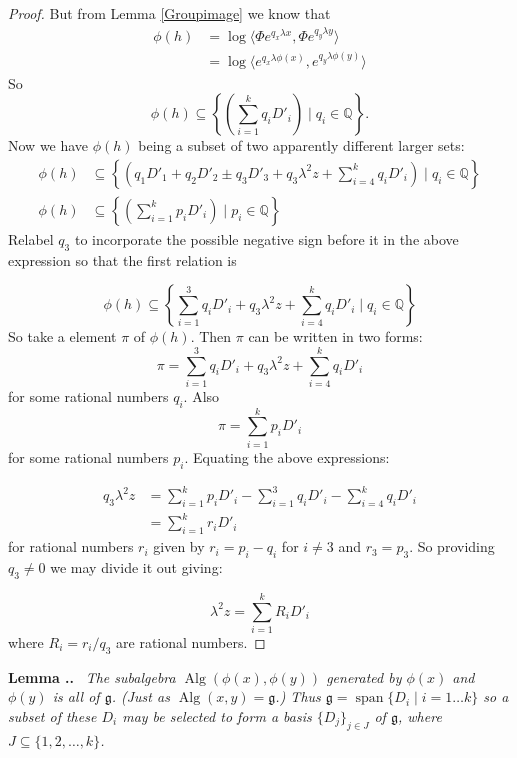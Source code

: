 \documentclass[honours]{UNSWthesis}
\newcommand{\Q}{\mathbb{Q}}
\newcommand{\g}{\mathfrak{g}}
\newcommand{\1}{\mathbf{e}_{1}}
\newcommand{\2}{\mathbf{e}_{3}}
\newcommand{\3}{\mathbf{e}_{3}}
\DeclareMathOperator{\alg}{Alg}
\DeclareMathOperator{\spn}{span}
\newcounter{Item}[section]
\newenvironment{Lemma}{\medskip
                            \refstepcounter{Item}
                            \noindent
                           {\bf Lemma \thesection.\theItem.}\ %
                            \begingroup \sl}
                           {\endgroup\medskip}
\begin{document}
\begin{proof}
But from Lemma \ref{Groupimage} we know that 
\begin{align*}
\phi (h) &= \log \langle \Phi e^{q_{x}\lambda x},\Phi e^{q_{y}\lambda y} \rangle \\
&= \log \langle e^{q_{x}\lambda \phi(x)},e^{q_{y}\lambda \phi(y)} \rangle
\end{align*}
So 
\[
\phi (h) \subseteq 
\left\lbrace \left(\sum\limits_{i=1}^{k}q_{i}D'_{i}\right) \mid q_{i} \in \Q \right\rbrace .
\]
Now we have $\phi(h)$ being a subset of two apparently different larger sets:
\begin{align*}
\phi(h) &\subseteq \left\lbrace \left(q_{1}D'_{1}+q_{2}D'_{2} \pm q_{3}D'_{3} + q_{3}\lambda^{2}z +\sum\limits_{i=4}^{k}q_{i}D'_{i}\right) \mid q_{i} \in \Q \right\rbrace \\
\phi (h) &\subseteq 
\left\lbrace \left(\sum\limits_{i=1}^{k}p_{i}D'_{i}\right) \mid p_{i} \in \Q \right\rbrace
\end{align*}
Relabel $q_{3}$ to incorporate the possible negative sign before it in the above expression so that the first relation is

\[
\phi(h) \subseteq \left\lbrace \sum\limits_{i=1}^{3}q_{i}D'_{i}+ q_{3}\lambda^{2}z +\sum\limits_{i=4}^{k}q_{i}D'_{i} \mid q_{i} \in \Q \right\rbrace 
\]
So take a element $\pi$ of $\phi (h)$. Then $\pi$ can be written in two forms:
\[
\pi = \sum\limits_{i=1}^{3}q_{i}D'_{i}+ q_{3}\lambda^{2}z +\sum\limits_{i=4}^{k}q_{i}D'_{i}
\]
for some rational numbers $q_{i}$. 
Also 
\[
\pi = \sum\limits_{i=1}^{k}p_{i}D'_{i}
\]
for some rational numbers $p_{i}$. Equating the above expressions:

\begin{align*}
q_{3}\lambda^{2} z &= \sum\limits_{i=1}^{k}p_{i}D'_{i} -\sum\limits_{i=1}^{3}q_{i}D'_{i} -\sum\limits_{i=4}^{k}q_{i}D'_{i} \\
&= \sum\limits_{i=1}^{k}r_{i}D'_{i}
\end{align*}
for rational numbers $r_{i}$ given by $r_{i}=p_{i}-q_{i}$ for $i \neq 3 $
and $r_{3}=p_{3}$. So providing $q_{3} \neq 0$ we may divide it out giving:

\[
\lambda^{2} z = \sum\limits_{i=1}^{k}R_{i}D'_{i}
\]
where $R_{i}=r_{i}/q_{3}$ are rational numbers.
\end{proof}




\begin{Lemma}
The subalgebra $\alg(\phi(x),\phi(y))$ generated by $\phi(x)$ and $\phi(y)$ is all of $\g$. (Just as $\alg(x,y)=\g$.) Thus $\g =\spn \{ D_{i} \mid i=1 \dots k  \} $ so a subset of these $D_{i}$ may be selected to form a basis $\{D_{j} \}_{j \in J}$ of $\g$, where $J \subseteq \{ 1,2,\ldots ,k \}$.
\end{Lemma}
\end{document}
